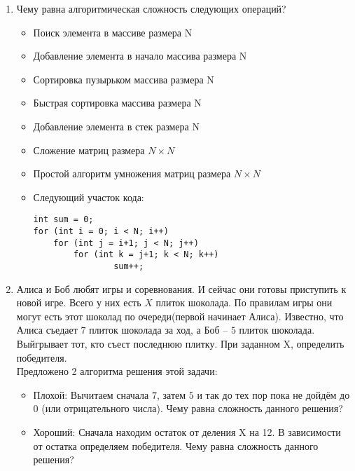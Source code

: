 \documentclass{article}
\begin{document}
\begin{enumerate}
\item \textbf{} Чему равна алгоритмическая сложность следующих операций?
\begin{itemize}
\item Поиск элемента в массиве размера N
\item Добавление элемента в начало массива размера N
\item Сортировка пузырьком массива размера N
\item Быстрая сортировка массива размера N
\item Добавление элемента в стек размера N
\item Сложение матриц размера  $N \times N$
\item Простой алгоритм умножения матриц размера  $N \times N$
\item Следующий участок кода:
\begin{verbatim}
int sum = 0;
for (int i = 0; i < N; i++)
    for (int j = i+1; j < N; j++)
        for (int k = j+1; k < N; k++)
                sum++;
\end{verbatim}
\end{itemize}

\item Алиса и Боб любят игры и соревнования. И сейчас они готовы приступить к новой игре. Всего у них есть $X$ плиток шоколада. По правилам игры они могут есть этот шоколад по очереди(первой начинает Алиса). Известно, что Алиса съедает $7$ плиток шоколада за ход, а Боб -- $5$ плиток шоколада. Выйгрывает тот, кто съест последнюю плитку. При заданном X, определить победителя. \\
Предложено 2 алгоритма решения этой задачи:
\begin{itemize}
\item Плохой: Вычитаем сначала $7$, затем $5$ и так до тех пор пока не дойдём до $0$ (или отрицательного числа). Чему равна сложность данного решения?
\item Хороший: Сначала находим остаток от деления X на 12. В зависимости от остатка определяем победителя. Чему равна сложность данного решения?
\end{itemize}
\end{enumerate}

\newpage
\end{document}
